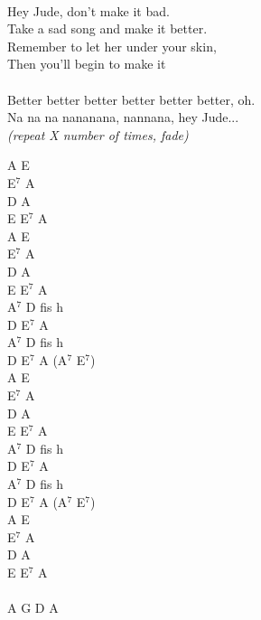 \documentclass[a5paper, 10pt]{book}
\begin{document}
\begin{minipage}[t]{0.8\textwidth}
  \\
  Hey Jude, don't make it bad.\\
  Take a sad song and make it better.\\
  Remember to let her under your skin,\\
  Then you'll begin to make it\\
  \\
  Better better better better better better, oh.\\
  Na na na nananana, nannana, hey Jude...\\
  \hspace*{23mm}\textit{\footnotesize(repeat X number of times, fade)}\\
\end{minipage}
\begin{minipage}[t]{0.2\textwidth}
  A E\\E$^7$ A\\D A\\E E$^7$ A\\

  A E\\E$^7$ A\\D A\\E E$^7$ A\\

  A$^7$ D fis h\\D E$^7$ A\\A$^7$ D fis h\\D E$^7$ A (A$^7$ E$^7$)\\

  A E\\E$^7$ A\\D A\\E E$^7$ A\\

  A$^7$ D fis h\\D E$^7$ A\\A$^7$ D fis h\\D E$^7$ A (A$^7$ E$^7$)\\

  A E\\E$^7$ A\\D A\\E E$^7$ A\\

  ~\\
  A G D A\\

\end{minipage}

\newpage
\end{document}
